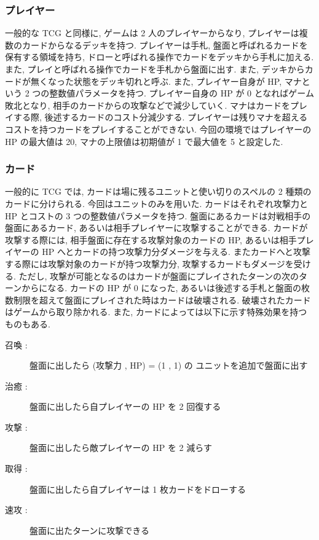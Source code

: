 \documentclass[12pt]{jarticle}
\begin{document}
\subsubsection{プレイヤー}
一般的な TCG と同様に, ゲームは 2 人のプレイヤーからなり, プレイヤーは複数のカードからなるデッキを持つ. 
プレイヤーは手札, 盤面と呼ばれるカードを保有する領域を持ち, ドローと呼ばれる操作でカードをデッキから手札に加える. また, プレイと呼ばれる操作でカードを手札から盤面に出す. また, デッキからカードが無くなった状態をデッキ切れと呼ぶ.  
また, プレイヤー自身が HP, マナという 2 つの整数値パラメータを持つ.
プレイヤー自身の HP が 0 となればゲーム敗北となり, 相手のカードからの攻撃などで減少していく.
マナはカードをプレイする際, 後述するカードのコスト分減少する. プレイヤーは残りマナを超えるコストを持つカードをプレイすることができない. 
今回の環境ではプレイヤーの HP の最大値は 20, マナの上限値は初期値が 1 で最大値を 5 と設定した.
\subsubsection{カード}
一般的に TCG では, カードは場に残るユニットと使い切りのスペルの 2 種類のカードに分けられる. 今回はユニットのみを用いた.
カードはそれぞれ攻撃力と HP とコストの 3 つの整数値パラメータを持つ.  盤面にあるカードは対戦相手の盤面にあるカード, あるいは相手プレイヤーに攻撃することができる. カードが攻撃する際には, 相手盤面に存在する攻撃対象のカードの HP, あるいは相手プレイヤーの HP へとカードの持つ攻撃力分ダメージを与える. またカードへと攻撃する際には攻撃対象のカードが持つ攻撃力分, 攻撃するカードもダメージを受ける.
ただし, 攻撃が可能となるのはカードが盤面にプレイされたターンの次のターンからになる. 
カードの HP が 0 になった, あるいは後述する手札と盤面の枚数制限を超えて盤面にプレイされた時はカードは破壊される. 破壊されたカードはゲームから取り除かれる. 
また, カードによっては以下に示す特殊効果を持つものもある.

\begin{description}
  \item[召喚 :]  盤面に出したら (攻撃力 , HP) = (1 , 1) の
  ユニットを追加で盤面に出す
  \item[治癒 :]  盤面に出したら自プレイヤーの HP を 2 回復する
  \item[攻撃 :]  盤面に出したら敵プレイヤーの HP を 2 減らす
  \item[取得 :]  盤面に出したら自プレイヤーは 1 枚カードをドローする
  \item[速攻 :]  盤面に出たターンに攻撃できる
\end{description}
\end{document}
